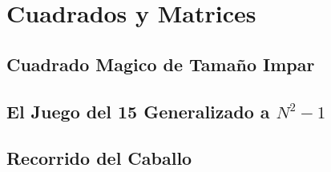 \section{Cuadrados y Matrices}
\subsection{Cuadrado Magico de Tama\~no Impar}
\raggedbottom
\hrulefill
\subsection{El Juego del 15 Generalizado a $N^2-1$}
\raggedbottom
\hrulefill
\subsection{Recorrido del Caballo}
\raggedbottom
\hrulefill

